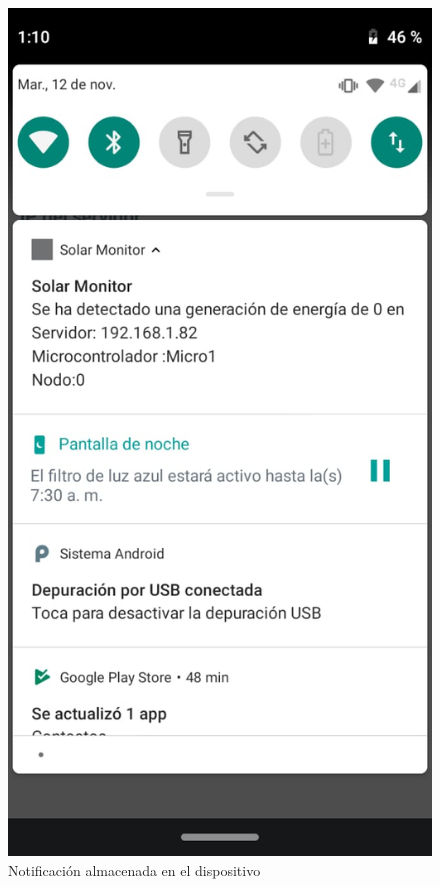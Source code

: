 \begin{figure}[H]
	\centering
	\includegraphics[scale=.4]{Capitulo4/software/submodulos/images/man36.png}
	\caption{Notificación almacenada en el dispositivo}	
	\label{fig:muestra 14}
\end{figure} 

